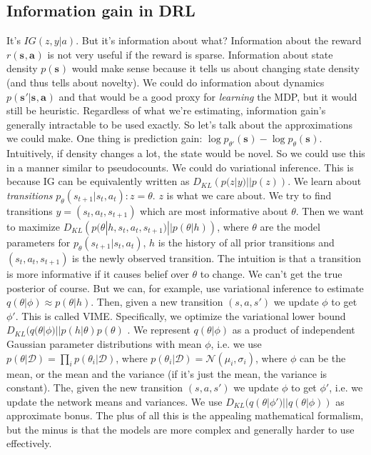 \documentclass{report}
\begin{document}
\subsection{Information gain in DRL}
It's $ IG(z,y|a)  $. But it's information about what?
Information about the reward $ r(\bm{s}_{}, \bm{a}_{})  $ is not very useful if the reward is sparse.
Information about state density $ p(\bm{s}_{})  $ would make sense because it tells us about changing state density (and thus tells about novelty).
We could do information about dynamics $ p(\bm{s}_{}'|\bm{s}_{}, \bm{a}_{})  $ and that would be a good proxy for \textit{learning} the MDP, but 
it would still be heuristic.
Regardless of what we're estimating, information gain's generally intractable to be used exactly.
So let's talk about the approximations we could make.
One thing is prediction gain: $ \log p_{\theta'}(\bm{s}_{}) - \log p_\theta(\bm{s}_{})  $.
Intuitively, if density changes a lot, the state would be novel. So we could use this in
a manner similar to pseudocounts.
We could do variational inference. This is because IG can be equivalently written as $ D_{KL} \left( p(z|y)||p(z) \right)   $.
We learn about \textit{transitions} $ p_\theta (s_{t+1}|s_t, a_t): z = \theta  $. $z$ is what we care about.
We try to find transitions $ y = \left( s_t, a_t, s_{t+1} \right)   $ which are most informative about $\theta$.
Then we want to maximize $ D_{KL} \left( p(\theta|h, s_t, a_t, s_{t+1})||p(\theta|h) \right)   $,
where $\theta$ are the model parameters for $ p_\theta (s_{t+1}|s_t, a_t)  $,
$h$ is the history of all prior transitions and $ \left( s_t, a_t, s_{t+1} \right)   $ is the newly
observed transition.
The intuition is that a transition is more informative if it causes belief over $\theta$ to change.
We can't get the true posterior of course.
But we can, for example, use variational inference to estimate $ q(\theta|\phi) \approx p(\theta|h)  $.
Then, given a new transition $ \left( s,a,s' \right)   $ we update $\phi$ to get $ \phi'  $.
This is called VIME. Specifically, we optimize the variational lower bound
$ D_{KL}(q(\theta|\phi)||p(h|\theta)p(\theta)  $ .
We represent $ q(\theta|\phi)  $ as a product of independent Gaussian parameter distributions with mean $ \phi  $,
i.e. we use $ p(\theta|\mathcal{D}) = \prod_{i}^{}p(\theta_i|\mathcal{D})   $,
where $ p(\theta_i|\mathcal{D}) = \mathcal{N}(\mu_i, \sigma_i)  $, where $\phi$ can be the mean, or 
the mean and the variance (if it's just the mean, the variance is constant).
The, given the new transition $ \left( s,a,s' \right)   $ we update $ \phi  $ to get $ \phi'  $,
i.e. we update the network means and variances.
We use $ D_{KL}(q(\theta|\phi')||q(\theta|\phi))  $ as approximate bonus.
The plus of all this is the appealing mathematical formalism, but the minus is that
the models are more complex and generally harder to use effectively.
\end{document}
